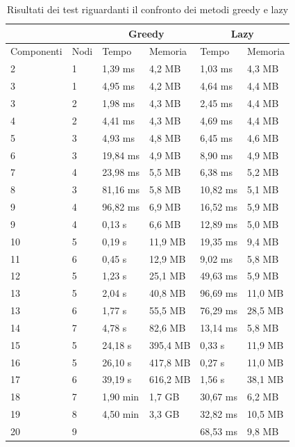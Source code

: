 \begin{table}[htbp] 
\begin{tabularx}{\textwidth}{X X X X X X}
\hline
   &  & \multicolumn{2}{c}{Greedy} & \multicolumn{2}{c}{Lazy}\\
\hline
Componenti & Nodi & Tempo & Memoria & Tempo & Memoria\\
\hline
2  & 1 & 1,39 ms  & 4,2 MB   & 1,03 ms    &	4,3 MB\\
3  &	 1 & 4,95 ms	  & 4,2 MB	 & 4,64 ms   & 	4,4 MB\\
3  &	 2 & 1,98 ms	  & 4,3 MB	 & 2,45 ms   & 	4,4 MB\\
4  & 2 &	 4,41 ms	  & 4,3 MB	 & 4,69 ms   &	4,4 MB\\
5  &	 3 &	 4,93 ms	  & 4,8 MB	 & 6,45 ms   & 	4,6 MB\\
6  & 3 &	 19,84 ms &	4,9 MB	 & 8,90 ms   &	4,9 MB\\
7  &	 4 &	 23,98 ms &	5,5 MB	 & 6,38 ms   &	5,2 MB\\
8  &	 3 &	 81,16 ms &	5,8 MB	 & 10,82 ms  &	5,1 MB\\
9  &	 4 &	 96,82 ms &	6,9 MB	 & 16,52 ms  &	5,9 MB\\
9  &	 4 &	 0,13 s	  & 6,6 MB	 & 12,89 ms  &	5,0 MB\\
10 &	 5 &	 0,19 s	  & 11,9 MB 	 & 19,35 ms	 & 9,4 MB\\
11 &	 6 &	 0,45 s	  & 12,9 MB	 & 9,02 ms	 & 5,8 MB\\
12 &	 5 &	 1,23 s	  & 25,1 MB	 & 49,63 ms	 & 5,9 MB\\
13 &	 5 &	 2,04 s	  & 40,8 MB	 & 96,69 ms	 & 11,0 MB\\
13 &	 6 &	 1,77 s	  & 55,5 MB	 & 76,29 ms	 & 28,5 MB\\
14 &	 7 &	 4,78 s	  & 82,6 MB	 & 13,14 ms	 & 5,8 MB\\
15 &	 5 &	 24,18 s	  & 395,4 MB	 & 0,33 s	 & 11,9 MB\\
16 &	 5 &	 26,10 s	  & 417,8 MB	 & 0,27 s	 & 11,0 MB\\
17 &	 6 &	 39,19 s	  & 616,2 MB &	1,56 s	 & 38,1 MB\\
18 &	 7 &	 1,90 min &	1,7 GB   &	30,67 ms	 & 6,2 MB\\
19 &	 8 & 4,50 min &	3,3 GB   &	32,82 ms	 & 10,5 MB\\
20 & 9 &	          &          &   68,53 ms &	9,8 MB\\
\hline
\end{tabularx}
\caption{Risultati dei test riguardanti il confronto dei metodi greedy e lazy}
\label{tab:test_all}
\end{table}

